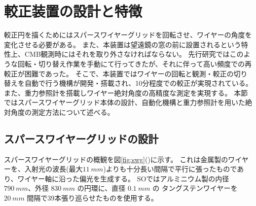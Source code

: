 \documentclass[../../main.tex]{subfiles}
\begin{document}
\section{較正装置の設計と特徴}
較正円を描くためにはスパースワイヤーグリッドを回転させ、ワイヤーの角度を変化させる必要がある。
また、本装置は望遠鏡の窓の前に設置されるという特性上、CMB観測時にはそれを取り外さなければならない。
先行研究ではこのような回転・切り替え作業を手動にて行ってきたが、それに伴って高い頻度での再較正が困難であった。
そこで、本装置ではワイヤーの回転と観測・較正の切り替えを自動で行う機構が開発・搭載され、10分程度での較正が実現されている。
また、重力参照計を搭載しワイヤー絶対角度の高精度な測定を実現する。
本節ではスパースワイヤーグリッド本体の設計、自動化機構と重力参照計を用いた絶対角度の測定方法について述べる。
\subsection{スパースワイヤーグリッドの設計}
\label{subsec:wg_design}
スパースワイヤーグリッドの概観を図\ref{fig:swg}()に示す。
これは金属製のワイヤーを、入射光の波長(最大$\SI{11}{mm}$)よりも十分長い間隔で平行に張ったものであり、ワイヤー軸に沿った偏光を生成する。
SOではアルミニウム製の内径$\SI{790}{mm}$、外径 $\SI{830}{mm}$ の円環に、直径 $\SI{0.1}{mm}$ の
タングステンワイヤーを $\SI{20}{mm}$ 間隔で$39$本張り巡らせたものを使用する\cite{swg:murata}。
\end{document}
